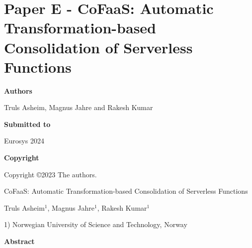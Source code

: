 \documentclass[../../../main.tex]{subfiles}
\begin{document}
\chapter[Paper E - CoFaaS: Automatic Consolidation of Serverless Functions][Paper E - CoFaaS: Consolidation of Serverless Functions]{Paper E - CoFaaS: Automatic Transformation-based Consolidation of Serverless Functions }
\label{chap:eurosys-paper}

\noindent \textbf{Authors}

\vspace*{0.3cm}

\noindent Truls Asheim, Magnus Jahre and Rakesh Kumar

\vspace*{0.7cm}

\noindent \textbf{Submitted to}

\vspace*{0.3cm}

\noindent Eurosys 2024

\vspace*{0.7cm}

\noindent \textbf{Copyright}

\vspace*{0.3cm}

\noindent Copyright ©2023 The authors.

\newpage

\vspace*{0.1cm}

\begin{center}

\Huge{CoFaaS: Automatic Transformation-based Consolidation of Serverless Functions}

\vspace{0.6cm}

\large{Truls Asheim$^{1}$, Magnus Jahre$^{1}$, Rakesh Kumar$^{1}$}

\vspace{0.1cm}

\small{1) Norwegian University of Science and Technology, Norway}


\end{center}

\vspace{0.2cm}

\begin{center}
  \textbf{Abstract}
  \end{center}
\begin{changemargin}{0.75cm}{0.75cm}

\end{changemargin}

\vspace{1cm}

\begin{refsection}[cofaas]
  
  \printbibliography[heading=refs]

\end{refsection}
\FloatBarrier
\end{document}
